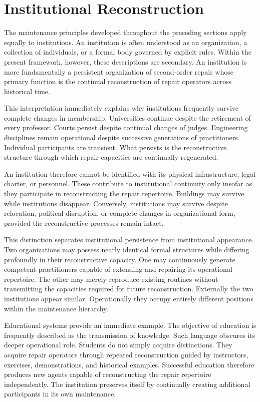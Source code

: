 \documentclass[12pt,oneside]{article}
\theoremstyle{plain}
\theoremstyle{definition}
\theoremstyle{remark}
\theoremstyle{plain}
\begin{document}
\section{Institutional Reconstruction}

The maintenance principles developed throughout the preceding sections apply equally to
institutions. An institution is often understood as an organization, a collection of individuals,
or a formal body governed by explicit rules. Within the present framework, however, these
descriptions are secondary. An institution is more fundamentally a persistent organization of
second-order repair whose primary function is the continual reconstruction of repair operators
across historical time.

This interpretation immediately explains why institutions frequently survive complete changes in
membership. Universities continue despite the retirement of every professor. Courts persist despite
continual changes of judges. Engineering disciplines remain operational despite successive
generations of practitioners. Individual participants are transient. What persists is the
reconstructive structure through which repair capacities are continually regenerated.

An institution therefore cannot be identified with its physical infrastructure, legal charter, or
personnel. These contribute to institutional continuity only insofar as they participate in
reconstructing the repair repertoire. Buildings may survive while institutions disappear.
Conversely, institutions may survive despite relocation, political disruption, or complete changes
in organizational form, provided the reconstructive processes remain intact.

This distinction separates institutional persistence from institutional appearance. Two
organizations may possess nearly identical formal structures while differing profoundly in their
reconstructive capacity. One may continuously generate competent practitioners capable of extending
and repairing its operational repertoire. The other may merely reproduce existing routines without
transmitting the capacities required for future reconstruction. Externally the two institutions
appear similar. Operationally they occupy entirely different positions within the maintenance
hierarchy.

Educational systems provide an immediate example. The objective of education is frequently
described as the transmission of knowledge. Such language obscures its deeper operational role.
Students do not simply acquire distinctions. They acquire repair operators through repeated
reconstruction guided by instructors, exercises, demonstrations, and historical examples. Successful
education therefore produces new agents capable of reconstructing the repair repertoire
independently. The institution preserves itself by continually creating additional participants in
its own maintenance.
\end{document}
